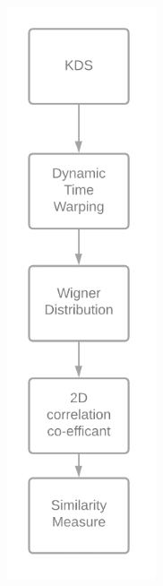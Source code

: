 \documentclass[10pt,a4paper]{report}
\begin{document}
\begin{figure}
	\centering
	\begin{subfigure}[b]{0.3\textwidth}
		\centering
		\includegraphics[width=\textwidth]{MathsBackend}

\end{subfigure}
\end{figure}
\end{document}
